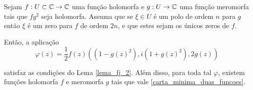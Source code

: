 \begin{teo}
	Sejam $f: U \subset \mathbb{C} \rightarrow \mathbb{C}$ uma função holomorfa e $g: U \rightarrow \mathbb{C}$ uma função meromorfa tais que $fg^2$ seja holomorfa. Assuma que se $\xi \in U$ é um polo de ordem $n$ para $g$ então $\xi$ é um zero para $f$ de ordem $2n$, e que estes sejam os únicos zeros de $f$.
	
	Então, a aplicação
	\begin{equation}\label{carta_minima_duas_funcoes}
		\varphi(z) = \frac{1}{2} f(z) \left( (1-g(z)^2), i (1+g(z)^2), 2g(z) \right)
	\end{equation}
	
	satisfaz as condições do Lema \ref{lema_fj_2}. Além disso, para toda tal $\varphi$, existem funções holomorfa $f$ e meromorfa $g$ tais que vale \ref{carta_minima_duas_funcoes}.
\end{teo}

